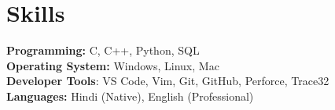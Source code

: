 \documentclass[letterpaper,9pt]{article}
\makeatletter
\newcommand{\resumeOrganizationHeading}[4]{
  \vspace{-2pt}\item
    \begin{tabular*}{0.97\textwidth}[t]{l@{\extracolsep{\fill}}r}
      \textbf{#1} & \textit{\small #2} \\
      \textit{\small#3}
    \end{tabular*}\vspace{-7pt}
}
\newcommand{\resumeSubHeadingListStart}{\begin{itemize}[leftmargin=0.15in, label={}]}
\newcommand{\resumeSubHeadingListEnd}{\end{itemize}}
\makeatother
\begin{document}

\section{Skills}
  \vspace{2pt}
  \resumeSubHeadingListStart
    \small{\item{
        \textbf{Programming:}{ C, C++, Python, SQL} \\
        \textbf{Operating System:}{ Windows, Linux, Mac} \\
        \textbf{Developer Tools}{: VS Code, Vim, Git, GitHub, Perforce, Trace32} \\
        \textbf{Languages:}{ Hindi (Native), English (Professional)}
    }}
  \resumeSubHeadingListEnd




        




    
    
\end{document}
